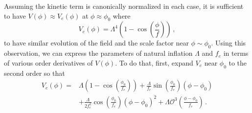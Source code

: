 \documentclass[11pt]{article}
\begin{document}
Assuming the kinetic term is canonically normalized in each case, it is sufficient to have $V\left(\phi\right) \approx V_{e}\left(\phi\right)$ at $\phi \approx \phi_0$ where
\begin{equation} \label{eq:naturalInflationPotential}
  V_e\left(\phi\right) = \Lambda^4 \left(1 - \cos\left(\frac{\phi}{f}\right)\right)\,,
\end{equation}
to have similar evolution of the field and the scale factor near $\phi \sim \phi_0$.
Using this observation, we can express the parameters of natural inflation $\Lambda$ and $f_e$ in terms of various order derivatives of $V\left(\phi\right)$.
To do that, first, expand $V_{e}$ near $\phi_0$ to the second order so that
\begin{equation} \label{eq:naturalInflationSeries}
  \begin{aligned}
    V_{e}\left(\phi\right) =
      &\Lambda \left(1 - \cos\left(\frac{\phi_0}{f_e}\right)\right)
        + \frac{\Lambda}{f_e} \sin\left(\frac{\phi_0}{f_e}\right) \left(\phi - \phi_0\right)\\
      & + \frac{\Lambda}{2 f_e^2} \cos\left(\frac{\phi_0}{f_e}\right) \left(\phi - \phi_0\right)^2
        + \Lambda \mathcal{O}^3\left(\frac{\phi - \phi_0}{f_e}\right)\,.
  \end{aligned}
\end{equation}
\end{document}
